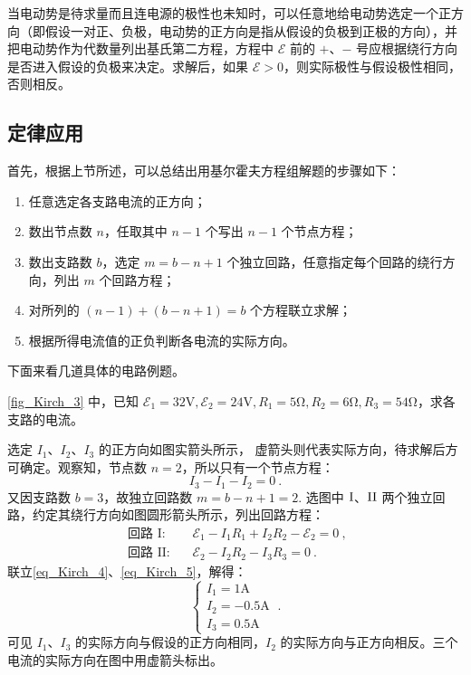当电动势是待求量而且连电源的极性也未知时，可以任意地给电动势选定一个正方向（即假设一对正、负极，电动势的正方向是指从假设的负极到正极的方向），并把电动势作为代数量列出基氏第二方程，方程中 $\mathscr E$ 前的 $+$、$-$ 号应根据绕行方向是否进入假设的负极来决定。求解后，如果 $\mathscr E>0$，则实际极性与假设极性相同，否则相反。 

\subsection{定律应用}

首先，根据上节所述，可以总结出用基尔霍夫方程组解题的步骤如下：
\begin{enumerate}
\item 任意选定各支路电流的正方向；
\item 数出节点数 $n$，任取其中 $n-1 $ 个写出 $n - 1 $ 个节点方程；
\item 数出支路数 $b$，选定 $m=b-n+1 $ 个独立回路，任意指定每个回路的绕行方向，列出 $m $ 个回路方程；
\item 对所列的 $(n-1)+(b-n+1)=b $ 个方程联立求解；
\item 根据所得电流值的正负判断各电流的实际方向。
\end{enumerate}

下面来看几道具体的电路例题。

\begin{example}{}
\autoref{fig_Kirch_3} 中，已知 $\mathscr{E}_{1}=32 \mathrm{V}, \mathscr{E}_{2}=24 \mathrm{V}, R_{1}=5 \mathrm{\Omega}, R_{2}=6 \mathrm{\Omega}, R_{3}=54 \mathrm{\Omega}$，求各支路的电流。

选定 $I_1$、$I_2$、$I_3$ 的正方向如图实箭头所示， 虚箭头则代表实际方向，待求解后方可确定。观察知，节点数 $n =2$，所以只有一个节点方程：
\begin{equation} \label{eq_Kirch_4}
I_{3}-I_{1}-I_{2}=0~.
\end{equation}
又因支路数 $b=3$，故独立回路数 $m = b - n + 1 =2 $. 选图中 $\rm I$、$\rm II$ 两个独立回路，约定其绕行方向如图圆形箭头所示，列出回路方程：
\begin{equation} \label{eq_Kirch_5}
\begin{aligned}\text { 回路 } \mathrm{I}: && \mathscr{E}_{1} - I_{1} R_{1} + I_{2} R_{2} -\mathscr{E}_{2} = 0~,\\ \text { 回路 } \mathrm{II}: && \mathscr{E}_{2} - I_{2} R_{2} - I_{3} R_{3} = 0~.\end{aligned}
\end{equation}
联立\autoref{eq_Kirch_4}、\autoref{eq_Kirch_5}，解得：
\begin{equation}
\begin{cases}
I_{1}=1 \mathrm{A} \\ 
I_{2}=-0.5 \mathrm{A} \\
I_{3}=0.5 \mathrm{A}
\end{cases}~.
\end{equation}
可见 $I_1$、$I_3$ 的实际方向与假设的正方向相同，$I_2$ 的实际方向与正方向相反。三个电流的实际方向在图中用虚箭头标出。
\end{example}

